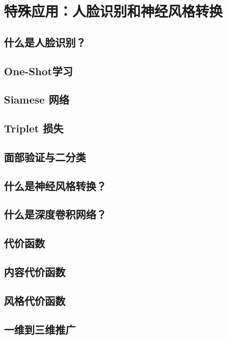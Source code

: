 \documentclass[../../main.tex]{subfiles}
\begin{document}
\chapter{特殊应用：人脸识别和神经风格转换}

\section{什么是人脸识别？}

\section{One-Shot学习}

\section{Siamese 网络}

\section{Triplet 损失}

\section{面部验证与二分类}

\section{什么是神经风格转换？}

\section{什么是深度卷积网络？}

\section{代价函数}

\section{内容代价函数}

\section{风格代价函数}

\section{一维到三维推广}
\end{document}
